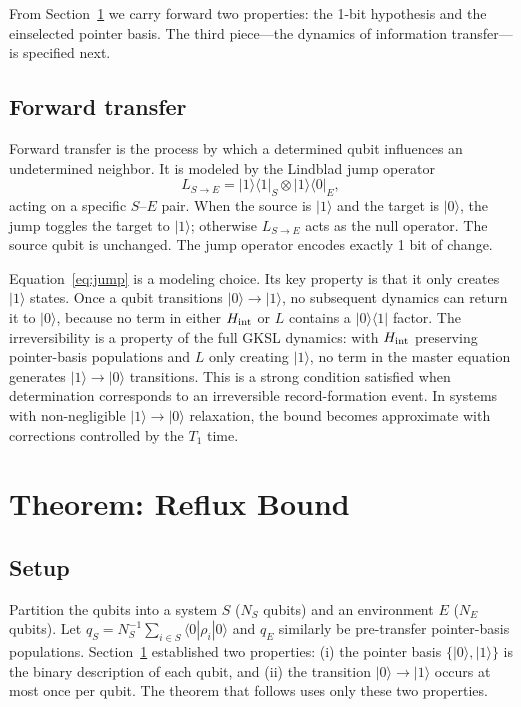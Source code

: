 \documentclass[aps,prl,twocolumn,superscriptaddress,hyperref]{revtex4-2}
\begin{document}
From Section~\ref{sec:model} we carry forward two properties: the 1-bit hypothesis and the einselected pointer basis. The third piece---the dynamics of information transfer---is specified next.

\subsection{Forward transfer}
\label{sec:forward}

Forward transfer is the process by which a determined qubit influences an undetermined neighbor. It is modeled by the Lindblad jump operator
\begin{equation}
L_{S\to E} = |1\rangle\langle 1|_S \otimes |1\rangle\langle 0|_E,
\label{eq:jump}
\end{equation}
acting on a specific $S$--$E$ pair. When the source is $|1\rangle$ and the target is $|0\rangle$, the jump toggles the target to $|1\rangle$; otherwise $L_{S\to E}$ acts as the null operator. The source qubit is unchanged. The jump operator encodes exactly 1 bit of change.

Equation~\eqref{eq:jump} is a modeling choice. Its key property is that it only creates $|1\rangle$ states. Once a qubit transitions $|0\rangle \to |1\rangle$, no subsequent dynamics can return it to $|0\rangle$, because no term in either $H_{\rm int}$ or $L$ contains a $|0\rangle\langle 1|$ factor. The irreversibility is a property of the full GKSL dynamics: with $H_{\rm int}$ preserving pointer-basis populations and $L$ only creating $|1\rangle$, no term in the master equation generates $|1\rangle \to |0\rangle$ transitions. This is a strong condition satisfied when determination corresponds to an irreversible record-formation event. In systems with non-negligible $|1\rangle \to |0\rangle$ relaxation, the bound becomes approximate with corrections controlled by the $T_1$ time.

\section{Theorem: Reflux Bound}
\label{sec:model}

\subsection{Setup}

Partition the qubits into a system $S$ ($N_S$ qubits) and an environment $E$ ($N_E$ qubits). Let $q_S = N_S^{-1}\sum_{i\in S} \langle 0|\rho_i|0\rangle$ and $q_E$ similarly be pre-transfer pointer-basis populations. Section~\ref{sec:model} established two properties: (i) the pointer basis $\{|0\rangle,|1\rangle\}$ is the binary description of each qubit, and (ii) the transition $|0\rangle \to |1\rangle$ occurs at most once per qubit. The theorem that follows uses only these two properties.
\end{document}
